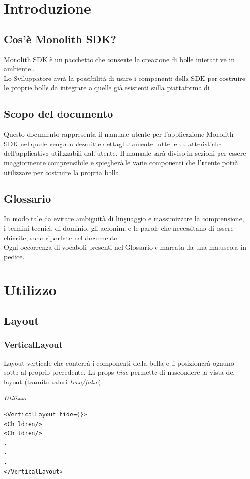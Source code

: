 \section{Introduzione}
\subsection{Cos'è Monolith SDK?}
Monolith SDK è un pacchetto  che consente la creazione di bolle interattive in ambiente .\\
Lo Sviluppatore avrà la possibilità di usare i componenti della SDK per costruire le proprie bolle da integrare a quelle già esistenti sulla piattaforma di .
\subsection{Scopo del documento}
Questo documento rappresenta il manuale utente per l'applicazione Monolith SDK nel quale vengono descritte dettagliatamente tutte le caratteristiche dell'applicativo utilizzabili dall'utente.
Il manuale sarà diviso in sezioni per essere maggiormente comprensibile e spiegherà le varie componenti che l'utente potrà utilizzare per costruire la propria bolla.
\subsection{Glossario}
In modo tale da evitare ambiguità di linguaggio e massimizzare la comprensione, i termini tecnici, di dominio, gli acronimi e le parole che necessitano di essere chiarite, sono riportate nel documento \gloss .\\
Ogni occorrenza di vocaboli presenti nel Glossario è marcata da una \glossario{} maiuscola in pedice.

\section{Utilizzo}

\subsection{Layout}
\subsubsection{VerticalLayout}
Layout verticale che conterrà i componenti della bolla e li posizionerà ognuno sotto al proprio precedente. La props \textit{hide} permette di nascondere la vista del layout (tramite valori \textit{true/false}).
\begin{center}
\underline{\textit{Utilizzo}}
\begin{lstlisting}
<VerticalLayout hide={}>
<Children/>
<Children/>
.
.
.
</VerticalLayout>
\end{lstlisting}
\end{center}
\newpage

